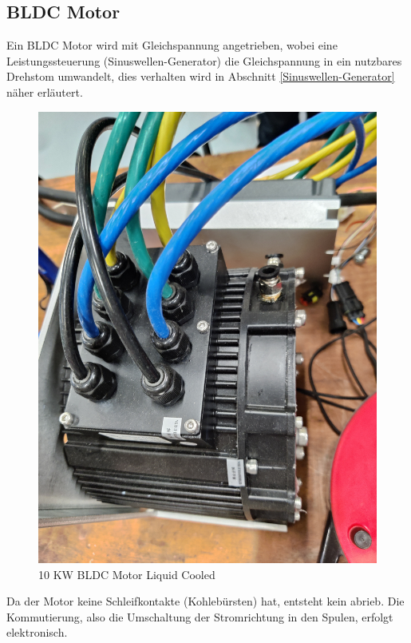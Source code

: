 \subsection{BLDC Motor}
\label{BLDC_Motor}
Ein BLDC Motor wird mit Gleichspannung angetrieben, wobei eine Leistungssteuerung (Sinuswellen-Generator) die Gleichspannung in ein nutzbares Drehstom umwandelt, dies verhalten wird in Abschnitt \ref{Sinuswellen-Generator} näher erläutert.\\
\begin{figure}[!ht]
	\begin{center}
		\includegraphics[width=\textwidth]{img/2_imp/2_pic_bldc_motor.png}
		\caption{10 KW BLDC Motor Liquid Cooled}
		\label{img_2_2:motor}
	\end{center}
\end{figure}

Da der Motor keine Schleifkontakte (Kohlebürsten) hat, entsteht kein abrieb. Die Kommutierung, also die Umschaltung der Stromrichtung in den Spulen, erfolgt elektronisch.

